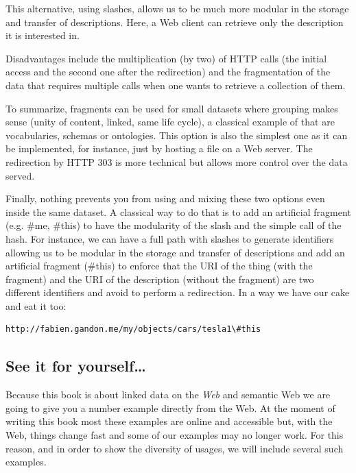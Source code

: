 This alternative, using slashes, allows us to be much more modular in
the storage and transfer of descriptions. Here, a Web client can
retrieve only the description it is interested in.

Disadvantages include the multiplication (by two) of HTTP calls (the
initial access and the second one after the redirection) and the
fragmentation of the data that requires multiple calls when one wants to
retrieve a collection of them.

To summarize, fragments can be used for small datasets where grouping
makes sense (unity of content, linked, same life cycle), a classical
example of that are vocabularies, schemas or ontologies. This option is
also the simplest one as it can be implemented, for instance, just by
hosting a file on a Web server. The redirection by HTTP 303 is more
technical but allows more control over the data served.

Finally, nothing prevents you from using and mixing these two options
even inside the same dataset. A classical way to do that is to add an
artificial fragment (e.g. \#me, \#this) to have the modularity of the
slash and the simple call of the hash. For instance, we can have a full
path with slashes to generate identifiers allowing us to be modular in
the storage and transfer of descriptions and add an artificial fragment
(\#this) to enforce that the URI of the thing (with the fragment) and
the URI of the description (without the fragment) are two different
identifiers and avoid to perform a redirection. In a way we have our
cake and eat it too:

\begin{lstlisting}
http://fabien.gandon.me/my/objects/cars/tesla1\#this
\end{lstlisting}

\hypertarget{see-it-for-yourself}{%
\subsection{See it for yourself\ldots{}}\label{see-it-for-yourself}}

Because this book is about linked data on the \emph{Web} and semantic
Web we are going to give you a number example directly from the Web. At
the moment of writing this book most these examples are online and
accessible but, with the Web, things change fast and some of our
examples may no longer work. For this reason, and in order to show the
diversity of usages, we will include several such examples.


